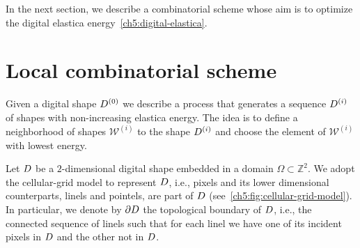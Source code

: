  In the next section, we describe a combinatorial scheme whose aim is to optimize the digital elastica energy~\cref{ch5:digital-elastica}.

\section{Local combinatorial scheme}
\label{ch5:sec:local-combinatorial-scheme}

Given a digital shape $D^{(0)}$ we describe a process that generates a
sequence $D^{(i)}$ of shapes with non-increasing elastica energy. The
idea is to define a neighborhood of shapes $\mathcal{W}^{(i)}$ to the
shape $D^{(i)}$ and choose the element of $\mathcal{W}^{(i)}$ with
lowest energy.  

Let $D$ be a $2$-dimensional digital shape embedded in a domain $\Omega \subset \mathbb{Z}^2$. We adopt the cellular-grid model to represent $D$, i.e., pixels and its lower dimensional counterparts, linels and pointels, are part of $D$ (see~\cref{ch5:fig:cellular-grid-model}). In particular, we denote by $\partial D$ the topological boundary of $D$, i.e., the connected sequence of linels such that for each linel we have one of its incident pixels in $D$ and the other not in $D$.

